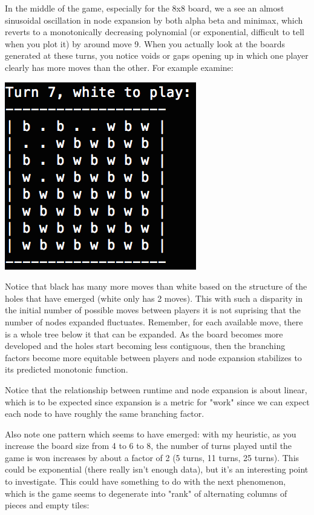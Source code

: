 \documentclass[12pt]{article}
\begin{document}
In the middle of the game, especially for the 8x8 board, we a see an almost sinusoidal oscillation in node expansion by both alpha beta and minimax, which reverts to a monotonically decreasing polynomial (or exponential, difficult to tell when you plot it) by around move 9. When you actually look at the boards generated at these turns, you notice voids or gaps opening up in which one player clearly has more moves than the other. For example examine: 


\includegraphics{./images/example.png}

Notice that black has many more moves than white based on the structure of the holes that have emerged (white only has 2 moves). This with such a disparity in the initial number of possible moves between players it is not suprising that the number of nodes expanded fluctuates. Remember, for each available move, there is a whole tree below it that can be expanded. As the board becomes more developed and the holes start becoming less contiguous, then the branching factors become more equitable between players and node expansion stabilizes to its predicted monotonic function. 


Notice that the relationship between runtime and node expansion is about linear, which is to be expected since expansion is a metric for "work" since we can expect each node to have roughly the same branching factor. 

Also note one pattern which seems to have emerged: with my heuristic, as you increase the board size from 4 to 6 to 8, the number of turns played until the game is won increases by about a factor of 2 (5 turns, 11 turns, 25 turns). This could be exponential (there really isn't enough data), but it's an interesting point to investigate. This could have something to do with the next phenomenon, which is the game seems to degenerate into "rank" of alternating columns of pieces and empty tiles: 
\end{document}

